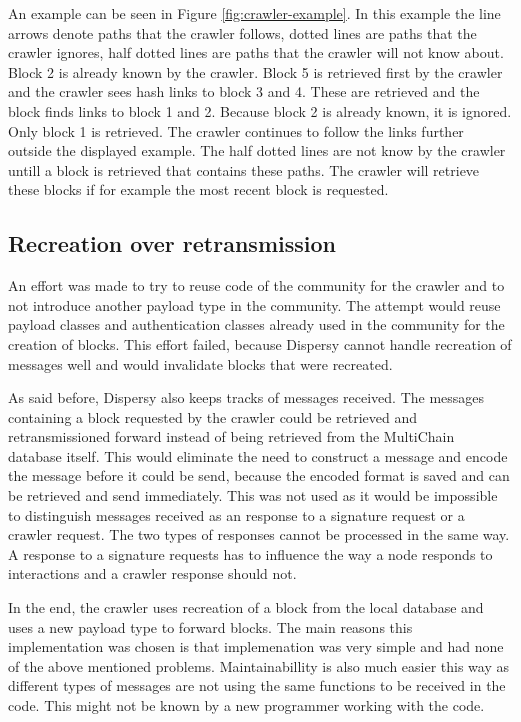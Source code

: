 An example can be seen in Figure \ref{fig:crawler-example}.
In this example the line arrows denote paths that the crawler follows,
dotted lines are paths that the crawler ignores,
half dotted lines are paths that the crawler will not know about.
Block 2 is already known by the crawler.
Block 5 is retrieved first by the crawler and the crawler sees hash links to block 3 and 4.
These are retrieved and the block finds links to block 1 and 2.
Because block 2 is already known, it is ignored.
Only block 1 is retrieved.
The crawler continues to follow the links further outside the displayed example.
The half dotted lines are not know by the crawler untill a block is retrieved that contains these paths.
The crawler will retrieve these blocks if for example the most recent block is requested.

\subsection{Recreation over retransmission}
An effort was made to try to reuse code of the community for the crawler and to not introduce another payload type in the community.
The attempt would reuse payload classes and authentication classes already used in the community for the creation of blocks.
This effort failed, because Dispersy cannot handle recreation of messages well
and would invalidate blocks that were recreated.

As said before, Dispersy also keeps tracks of messages received.
The messages containing a block requested by the crawler could be retrieved and retransmissioned forward
instead of being retrieved from the MultiChain database itself.
This would eliminate the need to construct a message and encode the message before it could be send,
because the encoded format is saved and can be retrieved and send immediately.
This was not used as it would be impossible to distinguish messages received as an response to a signature request or a crawler request.
The two types of responses cannot be processed in the same way.
A response to a signature requests has to influence the way a node responds to interactions
and a crawler response should not.

In the end, the crawler uses recreation of a block from the local database and uses a new payload type to forward blocks.
The main reasons this implementation was chosen is
that implemenation was very simple and had none of the above mentioned problems.
Maintainabillity is also much easier this way
as different types of messages are not using the same functions to be received in the code.
This might not be known by a new programmer working with the code.

